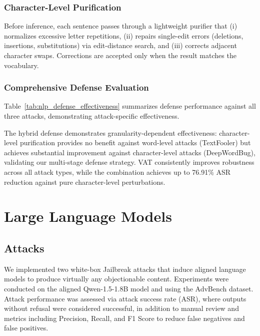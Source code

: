 \documentclass[conference]{IEEEtran}
\begin{document}
\subsubsection{Character-Level Purification}
Before inference, each sentence passes through a lightweight purifier that (i) normalizes excessive letter repetitions, (ii) repairs single-edit errors (deletions, insertions, substitutions) via edit-distance search, and (iii) corrects adjacent character swaps. Corrections are accepted only when the result matches the vocabulary.

\subsubsection{Comprehensive Defense Evaluation}
Table~\ref{tab:nlp_defense_effectiveness} summarizes defense performance against all three attacks, demonstrating attack-specific effectiveness.

\begin{table}[H]
\centering
\footnotesize
\caption{NLP Defense Effectiveness Against Adversarial Attacks}
\label{tab:nlp_defense_effectiveness}
\end{table}

The hybrid defense demonstrates granularity-dependent effectiveness: character-level purification provides no benefit against word-level attacks (TextFooler) but achieves substantial improvement against character-level attacks (DeepWordBug), validating our multi-stage defense strategy. VAT consistently improves robustness across all attack types, while the combination achieves up to 76.91\% ASR reduction against pure character-level perturbations.
\section{Large Language Models}
\subsection{Attacks}
We implemented two white-box Jailbreak attacks that induce aligned language models to produce virtually any objectionable content. Experiments were conducted on the aligned Qwen-1.5-1.8B model and using the AdvBench dataset. Attack performance was assessed via attack success rate (ASR), where outputs without refusal were considered successful, in addition to manual review and metrics including Precision, Recall, and F1 Score to reduce false negatives and false positives.\\
\end{document}
